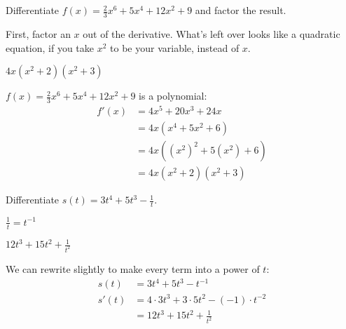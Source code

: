 \subsection*{\Procedural}



\begin{question} Differentiate
$f(x)=\frac{2}{3}x^6+5x^4+12x^2+9$ and factor the result.
\end{question}
\begin{hint} First, factor an $x$ out of the derivative. What's left over looks like a quadratic equation, if you take $x^2$ to be your variable, instead of $x$.
\end{hint}
\begin{answer} $4x(x^2+2)(x^2+3)$
\end{answer}
\begin{solution}
$f(x)=\frac{2}{3}x^6+5x^4+12x^2+9$ is a polynomial:
\begin{align*}
f'(x)&=4x^5+20x^3+24x\\&
=4x(x^4+5x^2+6)\\& = 4x((x^2)^2+5(x^2)+6)\\&=4x(x^2+2)(x^2+3)
\end{align*}
\end{solution}


\begin{question} Differentiate $s(t)=3t^4+5t^3-\frac{1}{t}$.
\end{question}
\begin{hint}
$\frac{1}{t}=t^{-1}$
\end{hint}
\begin{answer} $12t^3+15t^2+\frac{1}{t^2}$
\end{answer}
\begin{solution}  We can rewrite slightly to make every term into a power of $t$:
\begin{align*}
s(t)&=3t^4+5t^3-t^{-1}\\
s'(t)&=4\cdot 3t^{3}+3\cdot 5t^2-(-1)\cdot t^{-2}\\
&=12t^3+15t^2+\frac{1}{t^2}
\end{align*}
\end{solution}



